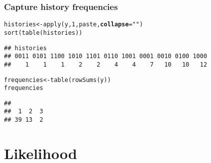 \documentclass[color=usenames,dvipsnames]{beamer}\usepackage[]{graphicx}\usepackage[]{color}
\makeatletter
\newcommand{\hlnum}[1]{\textcolor[rgb]{0.69,0.494,0}{#1}}%
\newcommand{\hlstr}[1]{\textcolor[rgb]{0.749,0.012,0.012}{#1}}%
\newcommand{\hlstd}[1]{\textcolor[rgb]{0,0,0}{#1}}%
\newcommand{\hlkwb}[1]{\textcolor[rgb]{0,0.341,0.682}{#1}}%
\newcommand{\hlkwc}[1]{\textcolor[rgb]{0,0,0}{\textbf{#1}}}%
\newcommand{\hlkwd}[1]{\textcolor[rgb]{0.004,0.004,0.506}{#1}}%
\newenvironment{kframe}{%
 \def\at@end@of@kframe{}%
 \ifinner\ifhmode%
  \def\at@end@of@kframe{\end{minipage}}%
  \begin{minipage}{\columnwidth}%
 \fi\fi%
 \def\FrameCommand##1{\hskip\@totalleftmargin \hskip-\fboxsep
 \colorbox{shadecolor}{##1}\hskip-\fboxsep
     \hskip-\linewidth \hskip-\@totalleftmargin \hskip\columnwidth}%
 \MakeFramed {\advance\hsize-\width
   \@totalleftmargin\z@ \linewidth\hsize
   \@setminipage}}%
 {\par\unskip\endMakeFramed%
 \at@end@of@kframe}
\newenvironment{knitrout}{}{} %
\makeatother
\begin{document}
\begin{frame}[fragile]
  \frametitle{Capture history frequencies}
  \centering
\begin{knitrout}\scriptsize
{}\color{fgcolor}\begin{kframe}
\begin{alltt}
\hlstd{histories} \hlkwb{<-} \hlkwd{apply}\hlstd{(y,} \hlnum{1}\hlstd{, paste,} \hlkwc{collapse}\hlstd{=}\hlstr{""}\hlstd{)}
\hlkwd{sort}\hlstd{(}\hlkwd{table}\hlstd{(histories))}
\end{alltt}
\begin{verbatim}
## histories
## 0011 0101 1100 1010 1101 0110 1001 0001 0010 0100 1000 
##    1    1    1    2    2    4    4    7   10   10   12
\end{verbatim}
\end{kframe}
\end{knitrout}
\begin{knitrout}\scriptsize
{}\color{fgcolor}\begin{kframe}
\begin{alltt}
\hlstd{frequencies} \hlkwb{<-} \hlkwd{table}\hlstd{(}\hlkwd{rowSums}\hlstd{(y))}
\hlstd{frequencies}
\end{alltt}
\begin{verbatim}
## 
##  1  2  3 
## 39 13  2
\end{verbatim}
\end{kframe}
\end{knitrout}
\end{frame}



\section{Likelihood}
\end{document}
